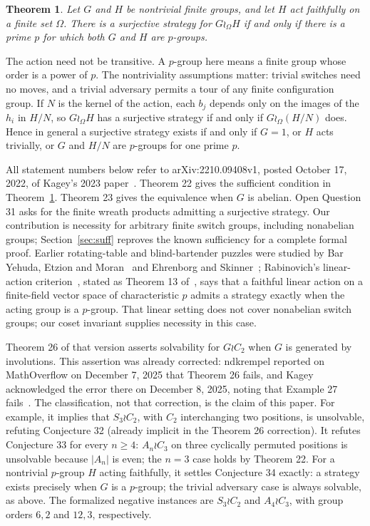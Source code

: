 \documentclass[11pt]{article}
\newtheorem{theorem}{Theorem}
\begin{document}
\begin{theorem}\label{thm:main}
Let $G$ and $H$ be nontrivial finite groups, and let $H$ act faithfully on
a finite set $\Omega$. There is a surjective strategy for $G\wr_\Omega H$
if and only if there is a prime $p$ for which both $G$ and $H$ are $p$-groups.
\end{theorem}

The action need not be transitive. A $p$-group here means a finite group
whose order is a power of $p$. The nontriviality assumptions matter:
trivial switches need no moves, and a trivial adversary permits a tour of
any finite configuration group. If $N$ is the kernel of the action, each
$b_j$ depends only on the images of the $h_i$ in $H/N$, so
$G\wr_\Omega H$ has a surjective strategy if and only if
$G\wr_\Omega(H/N)$ does. Hence in general a surjective strategy exists
if and only if $G=1$, or $H$ acts trivially, or $G$ and $H/N$ are
$p$-groups for one prime $p$.

All statement numbers below refer to arXiv:2210.09408v1, posted
October 17, 2022, of Kagey's 2023 paper~\cite{Kagey}.
Theorem 22 gives the sufficient condition in Theorem~\ref{thm:main}.
Theorem 23 gives the equivalence when $G$ is abelian.
Open Question 31 asks for the finite wreath products admitting a
surjective strategy. Our contribution is necessity for arbitrary finite
switch groups, including nonabelian groups; Section~\ref{sec:suff}
reproves the known sufficiency for a complete formal proof.
Earlier rotating-table and blind-bartender puzzles were studied by
Bar Yehuda, Etzion and Moran~\cite{BYEM} and Ehrenborg and
Skinner~\cite{ES}; Rabinovich's linear-action criterion~\cite{Rabinovich},
stated as Theorem 13 of~\cite[arXiv v1]{Kagey}, says that a faithful
linear action on a finite-field vector space of characteristic $p$
admits a strategy exactly when the acting group is a $p$-group.
That linear setting does not cover nonabelian switch groups; our coset
invariant supplies necessity in this case.

Theorem 26 of that version asserts solvability for $G\wr C_2$ when $G$
is generated by involutions. This assertion was already corrected:
ndkrempel reported on MathOverflow on December 7, 2025 that Theorem 26
fails, and Kagey acknowledged the error there on December 8, 2025,
noting that Example 27 fails~\cite{MO}.
The classification, not that correction, is the claim of this paper.
For example, it implies that $S_3\wr C_2$, with $C_2$ interchanging two
positions, is unsolvable, refuting Conjecture 32 (already implicit in
the Theorem 26 correction). It refutes Conjecture 33 for every $n\geq4$:
$A_n\wr C_3$ on three cyclically permuted positions is unsolvable
because $|A_n|$ is even; the $n=3$ case holds by Theorem 22.
For a nontrivial $p$-group $H$ acting faithfully, it settles Conjecture 34
exactly: a strategy exists precisely when $G$ is a $p$-group; the trivial
adversary case is always solvable, as above. The formalized negative
instances are $S_3\wr C_2$ and $A_4\wr C_3$, with group orders $6,2$
and $12,3$, respectively.
\end{document}
